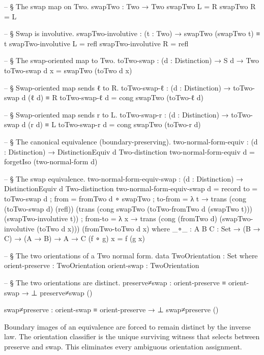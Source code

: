\documentclass[11pt,a4paper]{book}
\begin{document}
\begin{code}
-- § The swap map on Two.
swapTwo : Two → Two
swapTwo L = R
swapTwo R = L

-- § Swap is involutive.
swapTwo-involutive : (t : Two) → swapTwo (swapTwo t) ≡ t
swapTwo-involutive L = refl
swapTwo-involutive R = refl

-- § The swap-oriented map to Two.
toTwo-swap : (d : Distinction) → S d → Two
toTwo-swap d x = swapTwo (toTwo d x)

-- § Swap-oriented map sends ℓ to R.
toTwo-swap-ℓ : (d : Distinction) → toTwo-swap d (ℓ d) ≡ R
toTwo-swap-ℓ d = cong swapTwo (toTwo-ℓ d)

-- § Swap-oriented map sends r to L.
toTwo-swap-r : (d : Distinction) → toTwo-swap d (r d) ≡ L
toTwo-swap-r d = cong swapTwo (toTwo-r d)

-- § The canonical equivalence (boundary-preserving).
two-normal-form-equiv : (d : Distinction) → DistinctionEquiv d Two-distinction
two-normal-form-equiv d = forgetIso (two-normal-form d)

-- § The swap equivalence.
two-normal-form-equiv-swap : (d : Distinction) → DistinctionEquiv d Two-distinction
two-normal-form-equiv-swap d = record
  { to      = toTwo-swap d
  ; from    = fromTwo d ∘ swapTwo
  ; to-from = λ t → trans (cong (toTwo-swap d) (refl)) (trans (cong swapTwo (toTwo-fromTwo d (swapTwo t))) (swapTwo-involutive t))
  ; from-to = λ x → trans (cong (fromTwo d) (swapTwo-involutive (toTwo d x))) (fromTwo-toTwo d x)
  }
  where
    _∘_ : {A B C : Set} → (B → C) → (A → B) → A → C
    (f ∘ g) x = f (g x)

-- § The two orientations of a Two normal form.
data TwoOrientation : Set where
  orient-preserve : TwoOrientation
  orient-swap     : TwoOrientation

-- § The two orientations are distinct.
preserve≠swap : orient-preserve ≡ orient-swap → ⊥
preserve≠swap ()

swap≠preserve : orient-swap ≡ orient-preserve → ⊥
swap≠preserve ()
\end{code}

Boundary images of an equivalence are forced to remain distinct by the inverse law.
The orientation classifier is the unique surviving witness that selects between preserve and swap.
This eliminates every ambiguous orientation assignment.
\end{document}
